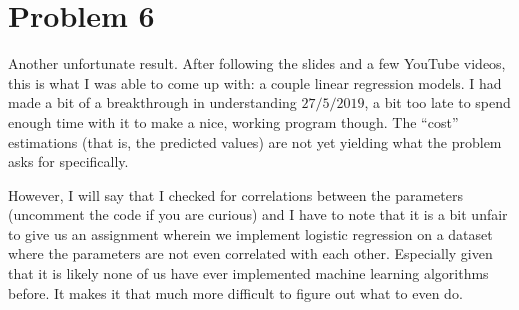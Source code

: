 \section{Problem 6}


Another unfortunate result. After following the slides and a few YouTube
videos, this is what I was able to come up with: a couple linear regression
models. I had made a bit of a breakthrough in understanding $27/5/2019$,
a bit too late to spend enough time with it to make a nice, working
program though. The ``cost'' estimations (that is, the predicted values)
are not yet yielding what the problem asks for specifically.

However, I will say that I checked for correlations between the parameters
(uncomment the code if you are curious) and I have to note that it is a bit
unfair to give us an assignment wherein we implement logistic regression on
a dataset where the parameters are not even correlated with each other.
Especially given that it is likely none of us have ever implemented machine
learning algorithms before. It makes it that much more difficult to figure out
what to even do.
